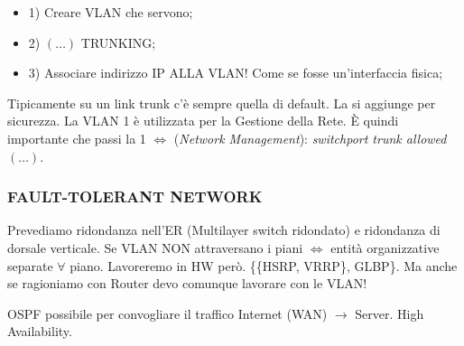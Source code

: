 \begin{itemize}
\begin{itemize}

\item{1)} Creare VLAN che servono;
\item{2)} $(\dots)$ TRUNKING;
\item{3)} Associare indirizzo IP ALLA VLAN! Come se fosse un'interfaccia fisica;

\end{itemize}

Tipicamente su un link trunk c'è sempre quella di default. La si aggiunge per sicurezza. La VLAN 1 è utilizzata per la Gestione della Rete. \`E quindi importante che passi la 1 $\iff$ (\textit{Network Management}): \textit{switchport trunk allowed $(\dots)$}.

\end{itemize}

\subsubsection{FAULT-TOLERANT NETWORK}

Prevediamo ridondanza nell'ER (Multilayer switch ridondato) e ridondanza di dorsale verticale. Se VLAN NON attraversano i piani $\iff$ entità organizzative separate $\forall$ piano. Lavoreremo in HW però. \{\{HSRP, VRRP\}, GLBP\}. Ma anche se ragioniamo con Router devo comunque lavorare con le VLAN!

OSPF possibile per convogliare il traffico Internet (WAN) $\rightarrow$ Server. High Availability.

